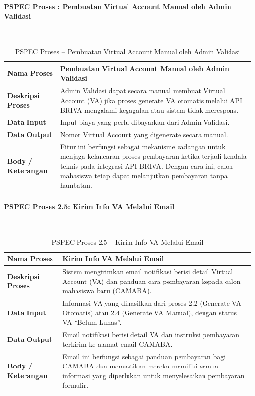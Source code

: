 \paragraph{PSPEC Proses : Pembuatan Virtual Account Manual oleh Admin Validasi}~\\
\begin{longtable}{|p{}|p{}|}
	\caption{PSPEC Proses  -- Pembuatan Virtual Account Manual oleh Admin Validasi}
	\label{table:3.pspec}\\
	\hline
	\textbf{Nama Proses} & Pembuatan Virtual Account Manual oleh Admin Validasi \\
	\hline
	\textbf{Deskripsi Proses} & Admin Validasi dapat secara manual membuat Virtual Account (VA) jika proses generate VA otomatis melalui API BRIVA mengalami kegagalan atau sistem tidak merespons. \\
	\hline
	\textbf{Data Input} & Input biaya yang perlu dibayarkan dari Admin Validasi. \\
	\hline
	\textbf{Data Output} & Nomor Virtual Account yang digenerate secara manual. \\
	\hline
	\textbf{Body / Keterangan} & Fitur ini berfungsi sebagai mekanisme cadangan untuk menjaga kelancaran proses pembayaran ketika terjadi kendala teknis pada integrasi API BRIVA. Dengan cara ini, calon mahasiswa tetap dapat melanjutkan pembayaran tanpa hambatan. \\
	\hline
\end{longtable}


\paragraph{PSPEC Proses 2.5: Kirim Info VA Melalui Email}~\\
\begin{longtable}{|p{}|p{}|}
	\caption{PSPEC Proses 2.5 -- Kirim Info VA Melalui Email}
	\label{table:3.pspec25}\\
	\hline
	\textbf{Nama Proses} & Kirim Info VA Melalui Email \\
	\hline
	\textbf{Deskripsi Proses} & Sistem mengirimkan email notifikasi berisi detail Virtual Account (VA) dan panduan cara pembayaran kepada calon mahasiswa baru (CAMABA). \\
	\hline
	\textbf{Data Input} & Informasi VA yang dihasilkan dari proses 2.2 (Generate VA Otomatis) atau 2.4 (Generate VA Manual), dengan status VA “Belum Lunas”. \\
	\hline
	\textbf{Data Output} & Email notifikasi berisi detail VA dan instruksi pembayaran terkirim ke alamat email CAMABA. \\
	\hline
	\textbf{Body / Keterangan} & Email ini berfungsi sebagai panduan pembayaran bagi CAMABA dan memastikan mereka memiliki semua informasi yang diperlukan untuk menyelesaikan pembayaran formulir. \\
	\hline
\end{longtable}


